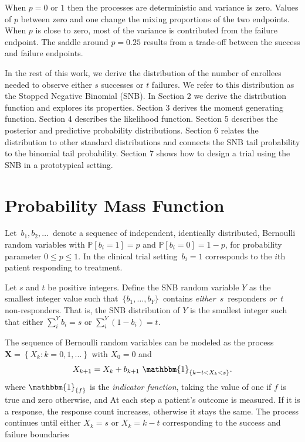 \documentclass[sii]{ipart}
\begin{document}
When $p=0$ or $1$ then the processes are deterministic and variance is zero.
Values of $p$ between zero and one change the mixing proportions of 
the two endpoints. When $p$ is close to zero, most of the variance
is contributed from the failure endpoint. The saddle around $p=0.25$ results 
from a trade-off between the success and failure endpoints.

In the rest of this work, we derive the distribution of the number of 
enrollees needed
to observe either $s$ successes or $t$ failures. We refer to this distribution
as the Stopped Negative Binomial (SNB). 
In Section 2 we derive the distribution function and explores its properties.
Section 3 derives the moment generating function.
Section 4 describes the likelihood function.
Section 5 describes the posterior and predictive probability distributions. Section 6 relates the distribution to other standard
distributions and connects the SNB tail probability to the binomial tail 
probability. Section 7 shows how to design a trial using the SNB in a prototypical setting.

\section{Probability Mass Function}
\label{notation.section}

Let $\,b_1, b_2, \ldots \,$ denote a sequence of independent, identically
distributed, Bernoulli random variables with $\mathbb{P}[b_i=1]=p$ and
$\mathbb{P}[b_i = 0] = 1-p$, for
probability parameter $0\leq p \leq 1$. In the clinical trial setting
$\,b_i = 1$ corresponds to the $i$th patient responding to treatment.  

Let $s$ and $t$ be positive integers.  Define the SNB random
variable $Y$ as the smallest
integer value such that $\,\{b_1, \ldots , b_Y\}\,$ contains {\em either}
$\,s\,$ responders {\em or} $\,t\,$ non-responders. That is, the SNB 
distribution of $Y$ is the smallest integer such that either
$\sum_i^Y b_i = s$ or $\sum_i^Y (1-b_i) = t$.

The sequence of Bernoulli random variables can be modeled as the process 
$\mathbf{X} = \left\{X_k : k = 0,1,... \right\}$
with $X_0=0$ and
\begin{equation*} \label{eqn:proc}
X_{k+1} = X_k + b_{k+1} \ \mathbbm{1}_{\{ k-t < X_k < s\}}.
\end{equation*}
where $\mathbbm{1}_{\{f\}}$ is the {\em indicator function}, taking the value 
of one if $f$ is true and zero otherwise, and
At each step a patient's outcome is measured. If it is a response, the response count increases, otherwise it stays the same. The process continues until either 
$X_k = s$ or $X_k = k-t$ corresponding to the success and failure boundaries
\end{document}
